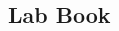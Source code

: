 \documentclass[12pt]{article}
\begin{document}
%


%

\newpage
\subsection{Lab Book}

\newpage
\listoffigures


\newpage
\thispagestyle{empty}
\begin{thebibliography}{9}

  

  
  

\end{thebibliography}
\end{document}

